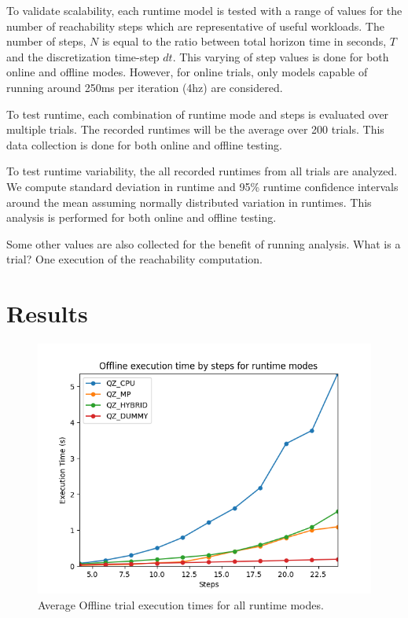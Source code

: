 \documentclass[runningheads]{llncs}
\begin{document}
To validate scalability, each runtime model is tested with a range of values for the number of reachability steps which are representative of useful workloads. The number of steps, $N$ is equal to the ratio between total horizon time in seconds, $T$ and the discretization time-step $dt$. This varying of step values is done for both online and offline modes. However, for online trials, only models capable of running around 250ms per iteration (4hz) are considered.

To test runtime, each combination of runtime mode and steps is evaluated over multiple trials. The recorded runtimes will be the average over 200 trials. This data collection is done for both online and offline testing.

To test runtime variability, the all recorded runtimes from all trials are analyzed. We compute standard deviation in runtime and 95\% runtime confidence intervals around the mean assuming normally distributed variation in runtimes. This analysis is performed for both online and offline testing.

Some other values are also collected for the benefit of running analysis. 
What is a trial? One execution of the reachability computation.  


\section{Results}

\begin{figure}[t]
\includegraphics[width=\textwidth]{profiler_out/offline_avg_unified.png}
\caption{Average Offline trial execution times for all runtime modes.} \label{offline_avg}
\end{figure}
\end{document}
